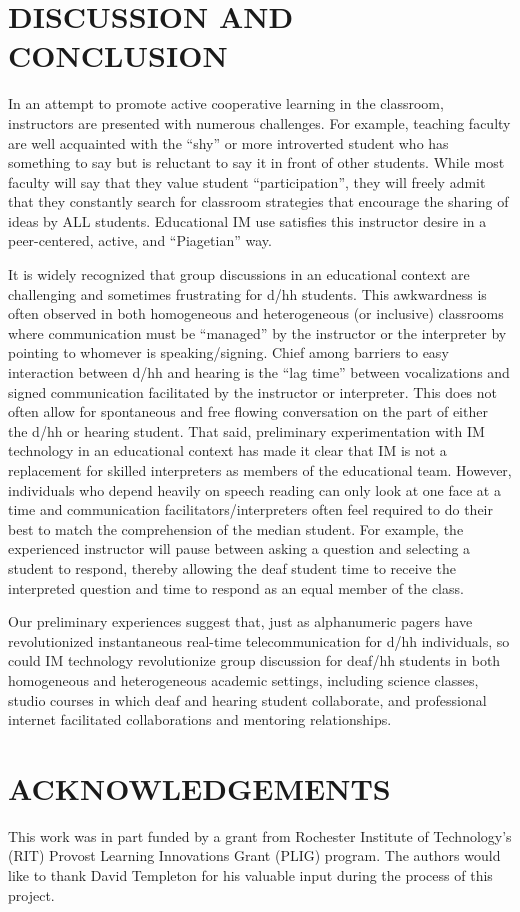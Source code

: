 \documentclass[11.5pt]{sig-alternate} %
\begin{document}
\begin{large}
\section*{DISCUSSION AND CONCLUSION}

In an attempt to promote active cooperative learning in the classroom, instructors are presented with numerous challenges. For example, teaching faculty are well acquainted with the “shy” or more introverted student who has something to say but is reluctant to say it in front of other students. While most faculty will say that they value student “participation”, they will freely admit that they constantly search for classroom strategies that encourage the sharing of ideas by ALL students. Educational IM use satisfies this instructor desire in a peer-centered, active, and “Piagetian” way. 

It is widely recognized that group discussions in an educational context are challenging and sometimes frustrating for d/hh students. This awkwardness is often observed in both homogeneous and heterogeneous (or inclusive) classrooms where communication must be ``managed'' by the instructor or the interpreter by pointing to whomever is speaking/signing. Chief among barriers to easy interaction between d/hh and hearing is the “lag time” between vocalizations and signed communication facilitated by the instructor or interpreter. This does not often allow for spontaneous and free flowing conversation on the part of either the d/hh or hearing student. That said, preliminary experimentation with IM technology in an educational context has made it clear that IM is not a replacement for skilled interpreters as members of the educational team. However, individuals who depend heavily on speech reading can only look at one face at a time and communication facilitators/interpreters often feel required to do their best to match the comprehension of the median student. For example, the experienced instructor will pause between asking a question and selecting a student to respond, thereby allowing the deaf student time to receive the interpreted question and time to respond as an equal member of the class. 

Our preliminary experiences suggest that, just as alphanumeric pagers have revolutionized instantaneous real-time telecommunication for d/hh individuals, so could IM technology revolutionize group discussion for deaf/hh students in both homogeneous and heterogeneous academic settings, including science classes, studio courses in which deaf and hearing student collaborate, and professional internet facilitated collaborations and mentoring relationships. 

\section*{ACKNOWLEDGEMENTS}
 
This work was in part funded by a grant from Rochester Institute of Technology’s (RIT) Provost Learning Innovations Grant (PLIG) program. The authors would like to thank David Templeton for his valuable input during the process of this project. 

\end{large}
 
\end{document}
